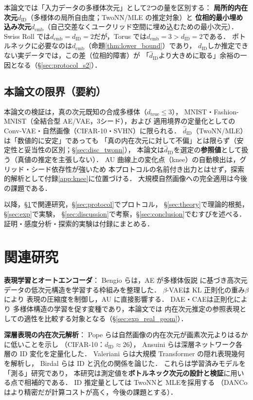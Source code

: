\documentclass[11pt,a4paper]{jsarticle}
\newcommand{\dID}{d_{\mathrm{ID}}}
\newcommand{\hatdID}{\hat{d}_{\mathrm{ID}}}
\newcommand{\dtrue}{d_{\mathrm{true}}}
\newcommand{\demb}{d_{\mathrm{emb}}}
\begin{document}
本論文では「入力データの多様体次元」として2つの量を区別する：
\textbf{局所的内在次元}$\dID$（多様体の局所自由度；TwoNN/MLE の推定対象）と
\textbf{位相的最小埋め込み次元}$\demb$（自己交差なくユークリッド空間に埋め込むための最小次元）．
Swiss Roll では$\demb = \dID = 2$だが，Torus では$\demb = 3 > \dID = 2$である．
ボトルネックに必要なのは$\demb$（命題\ref{thm:lower_bound}）であり，
$\dID$しか推定できない実データでは，この差（位相的障害）が
「$\hatdID$より大きめに取る」余裕の一因となる（§\ref{sec:protocol_s2}）．

\subsection{本論文の限界（要約）}\label{sec:intro_limits}

本論文の検証は，真の次元既知の合成多様体（$\dtrue \leq 3$），
MNIST・Fashion-MNIST（全結合型 AE/VAE，3シード），および
適用境界の定量化としての Conv-VAE・自然画像（CIFAR-10・SVHN）に限られる．
$\hatdID$（TwoNN/MLE）は「数値的に安定」であっても
「真の内在次元に対して不偏」とは限らず（安定性と妥当性の区別；§\ref{sec:disc_twonn}），
本論文は$\hatdID$を選定の\textbf{参照値}として扱う（真値の推定を主張しない）．
AU 曲線上の変化点（knee）の自動検出は，グリッド・シード依存性が強いため
本プロトコルの名前付き出力とはせず，探索的解析として付録\ref{app:knee}に位置づける．
大規模自然画像への完全適用は今後の課題である．

以降，§\ref{sec:related}で関連研究，§\ref{sec:protocol}でプロトコル，
§\ref{sec:theory}で理論的根拠，§\ref{sec:exp}で実験，
§\ref{sec:discussion}で考察，§\ref{sec:conclusion}でむすびを述べる．
証明・感度分析・探索的実験は付録にまとめる．

\section{関連研究}\label{sec:related}

\textbf{表現学習とオートエンコーダ}：
Bengio ら\cite{bengio2013representation}は，AE が多様体仮説
\cite{fefferman2016manifold}に基づき高次元データの低次元構造を学習する枠組みを整理した．
$\beta$-VAE\cite{higgins2017betavae}は KL 正則化の重み$\beta$により
表現の圧縮度を制御し，AU に直接影響する．
DAE\cite{alain2014dae}・CAE\cite{rifai2011cae}は正則化により
多様体構造の学習を促す変種であり，本論文では
内在次元推定の参照表現としての適性を比較する対象となる（§\ref{sec:exp_real_geom}）．

\textbf{深層表現の内在次元解析}：
Pope ら\cite{pope2021intrinsic}は自然画像の内在次元が画素次元よりはるかに低いことを示し
（CIFAR-10：$\dID \approx 26$），
Ansuini ら\cite{ansuini2019intrinsic}は深層ネットワーク各層の ID 変化を定量化した．
Valeriani ら\cite{valeriani2023geometry}は大規模 Transformer の隠れ表現幾何を解析し，
Birdal ら\cite{birdal2021intrinsic}は ID と汎化の関係を論じた．
これらは学習済みモデルを「測る」研究であり，
本研究は測定値を\textbf{ボトルネック次元の設計と検証}に用いる点で相補的である．
ID 推定量としては TwoNN\cite{facco2017twonn}と MLE\cite{levina2005mle}を採用する
（DANCo\cite{ceruti2014danco}はより精密だが計算コストが高く，今後の課題とする）．
\end{document}
